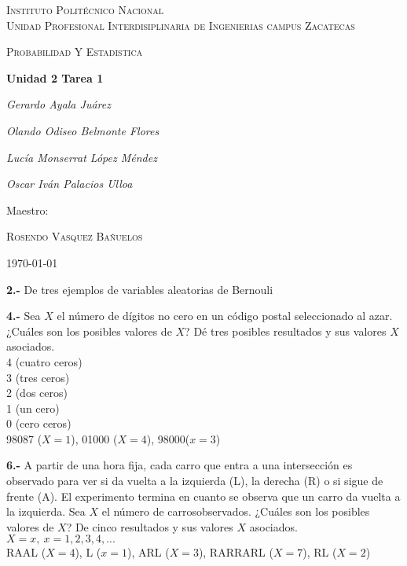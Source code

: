 \documentclass[12pt, letterpaper, spanish]{article}
\begin{document}
\begin{titlepage}
	\centering
	{\scshape\LARGE Instituto Politécnico Nacional\\ Unidad Profesional Interdisiplinaria de Ingenierias campus Zacatecas\par}
	\vspace{1cm}
	{\scshape\Large Probabilidad Y Estadistica\par}
	\vspace{1.5cm}
	{\huge\bfseries Unidad 2 Tarea 1\par}
	\vspace{2cm}
	{\Large\itshape Gerardo Ayala Juárez\par}
	{\Large\itshape Olando Odiseo Belmonte Flores\par}
	{\Large\itshape Lucía Monserrat López Méndez\par}
	{\Large\itshape Oscar Iván Palacios Ulloa\par}
	\vfill
	Maestro:\par
	\textsc{
	Rosendo Vasquez Bañuelos}
	\vfill
	{\large \today \par}
\end{titlepage}
\textbf{2.-} De tres ejemplos de variables aleatorias de Bernouli\vskip0.5cm

\textbf{4.-} Sea $X$ el número de dígitos no cero en un código postal seleccionado al azar. ¿Cuáles  son los posibles valores de $X$? Dé tres posibles resultados y sus valores $X$ asociados.\\
4 (cuatro ceros)\\
3 (tres ceros)\\
2 (dos ceros)\\
1 (un cero)\\
0 (cero ceros)\\
98087 ($X=1$), 01000 ($X=4$), 98000($x=3$) \vskip0.5cm

\textbf{6.-} A partir de una hora fija, cada carro que entra a una intersección es observado para ver si da vuelta a la izquierda (L), la derecha (R) o si sigue de frente (A). El experimento termina en cuanto se observa que un carro da vuelta a la izquierda. Sea $X$ el número de carrosobservados. ¿Cuáles son los posibles valores de $X$? De cinco resultados y sus valores $X$ asociados.\\
$X = x,\ x=1,2,3,4,...$\\
RAAL ($X=4$), L ($x=1$), ARL ($X=3$), RARRARL ($X=7$), RL ($X=2$) \vskip0.5cm
\end{document}

